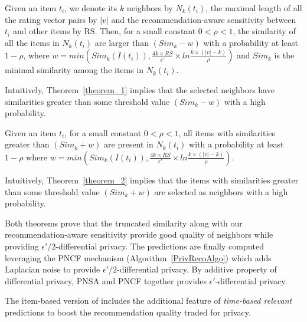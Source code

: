 
\begin{theorem}
\label{theorem_1}
Given an item $t_i$, we denote its $k$ neighbors by $N_k(t_i)$, the maximal length of all the rating vector pairs by $|v|$ and the recommendation-aware sensitivity between $t_i$ and other items by RS. Then, for a small constant  $0< \rho <1$, the similarity of all the items in $N_k(t_i)$ are larger than $(Sim_k -w)$ with a probability at least $1 - \rho$, where $w=min(Sim_k(I(t_i)), \frac{4k \times RS}{\epsilon'} \times ln\frac{k \times (|v| - k)}{\rho})$ and $Sim_k$ is the minimal similarity among the items in $N_k(t_i)$.
\end{theorem}

Intuitively, Theorem~\ref{theorem_1} implies that the selected neighbors have similarities greater than some threshold value $(Sim_k -w)$ with a high probability.

\begin{theorem}
\label{theorem_2}
Given an item $t_i$, for a small constant   $0 <\rho <1$, all items with similarities greater than $(Sim_k +w)$ are present in $N_k(t_i)$ with a probability at least $1-\rho$ where $w=min(Sim_k(I(t_i)), \frac{4k \times RS}{\epsilon'} \times ln\frac{k \times (|v| - k)}{\rho})$.
\end{theorem}

Intuitively, Theorem~\ref{theorem_2} implies that the items with similarities greater than some threshold value $(Sim_k +w)$ are selected as neighbors with a high probability.

Both theorems prove that the truncated similarity along with our recommendation-aware sensitivity provide good quality of neighbors while providing $\epsilon'/2$-differential privacy. The predictions are finally computed leveraging the PNCF mechanism (Algorithm~\ref{PrivRecoAlgo}) which adds Laplacian noise to provide $\epsilon'/2$-differential privacy. By additive property of differential privacy, PNSA and PNCF together provides $\epsilon'$-differential privacy.

The item-based version of \crossrec includes the additional feature of \emph{time-based relevant} predictions to boost the recommendation quality traded for privacy.




